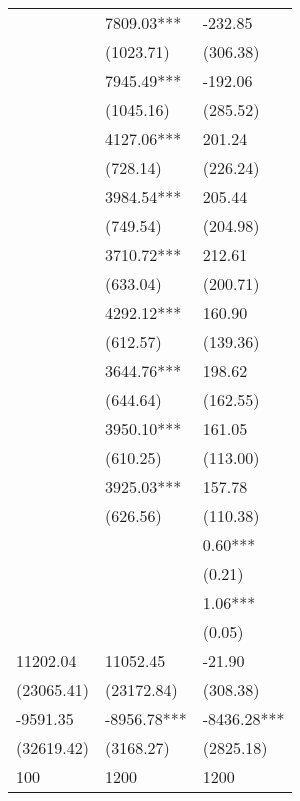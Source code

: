 \begin{tabular}{lll}
 & 7809.03*** & -232.85 \\
 & (1023.71) & (306.38) \\
 & 7945.49*** & -192.06 \\
 & (1045.16) & (285.52) \\
 & 4127.06*** & 201.24 \\
 & (728.14) & (226.24) \\
 & 3984.54*** & 205.44 \\
 & (749.54) & (204.98) \\
 & 3710.72*** & 212.61 \\
 & (633.04) & (200.71) \\
 & 4292.12*** & 160.90 \\
 & (612.57) & (139.36) \\
 & 3644.76*** & 198.62 \\
 & (644.64) & (162.55) \\
 & 3950.10*** & 161.05 \\
 & (610.25) & (113.00) \\
 & 3925.03*** & 157.78 \\
 & (626.56) & (110.38) \\
 &  & 0.60*** \\
 &  & (0.21) \\
 &  & 1.06*** \\
 &  & (0.05) \\
11202.04 & 11052.45 & -21.90 \\
(23065.41) & (23172.84) & (308.38) \\
-9591.35 & -8956.78*** & -8436.28*** \\
(32619.42) & (3168.27) & (2825.18) \\
100 & 1200 & 1200 \\
\bottomrule
\end{tabular}
